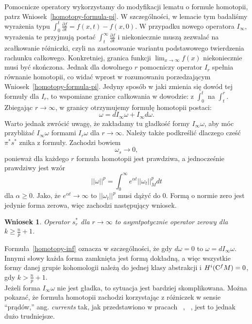 \documentclass[licencjacka]{pracamgr}
\theoremstyle{definition}
\theoremstyle{definition}
\theoremstyle{plain}
\theoremstyle{plain}
\theoremstyle{plain}
\theoremstyle{plain}
\newtheorem{wniosek}{Wniosek}[section]
\def\cfm{\ensuremath\mathrm{C}^fM}
\begin{document}
Pomocnicze operatory wykorzystamy do modyfikacji lematu o
formule homotopii, patrz Wniosek~\ref{homotopy-formula-pi}.
W szczególności, w lemacie tym badaliśmy wyrażenia typu
$\int_0^t \frac{\partial f }{\partial t} = f(x, t) - f(x, 0)$.
W przypadku nowego operatora $I_\infty$, wyrażenia te przyjmują postać
$\int_t^\infty \frac{\partial f }{\partial t}$ i niekoniecznie muszą
zezwalać na zcałkowanie różniczki, czyli na zastosowanie wariantu podstawowego
twierdzenia rachunku całkowego. Konkretniej, granica funkcji $\lim_{x \to \infty} f(x)$
niekoniecznie musi być skończona. Jednak dla dowolnego $r$ pomocniczy
operator $I_r$ spełnia równanie homotopii, co widać wprost w rozumowaniu
porzedzającym
Wniosek~\ref{homotopy-formula-pi}.
Jedyny sposób w jaki zmienia się dowód tej formuły dla $I_r$, to wspomiane granice
całkowania w dowodzie: z $\int_0^t$ na $\int_t^r$.
Zbiegając $r \to \infty$,  w granicy otrzymujemy formułę homotopii postaci:
\[\label{homotopy-inf}
\omega = dI_\infty \omega + I_\infty d \omega.
\]
Warto jednak zwrócić uwagę, że zakładamy tu gładkość formy $I_\infty \omega$,
aby móc przybliżać  $I_\infty\omega$ formami $I_r\omega$ dla $r \rightarrow
\infty$.  Należy także podkreślić dlaczego cześć $\pi^\ast s^\ast$ znika z
formuły.  Zachodzi bowiem
\[
 \omega_s  \to 0, 
\]
ponieważ dla każdego $r$ formuła homotopii jest prawdziwa, a jednocześnie
prawdziwy jest wzór
\[
|| \omega ||^p = \int_0^\infty e^{\alpha t} || \omega_t ||^p_M dt
\]
 dla $\alpha \geq 0$. Jako, że $e^{\alpha t} \to \infty$ to $|| \omega_t ||^p$
musi dążyć do 0.  Formą o normie zero jest jedynie forma zerowa, więc zachodzi
następujący wniosek.
\begin{wniosek}\label{asymtpotic-s-null-operator}
Operator $s_r^\ast$ dla $r \to \infty$ to asymtpotycznie operator zerowy dla
$k \geq \frac{n}{p} + 1$.
\end{wniosek}

Formuła~\ref{homotopy-inf} oznacza w szczególności, że gdy $d \omega = 0$ to
$\omega = d I_\infty \omega$. Innymi słowy każda forma zamknięta jest formą
dokładną, a więc wszystkie formy danej grupie kohomologii należą do jednej
klasy abstrakcji i $H^i(\cfm) = 0$, gdy $k > \frac{n}{p} + 1$. \\

Jeżeli forma $I_\infty\omega$ nie jest gładka, to sytuacja jest bardziej
skomplikowana.  Można pokazać, że formuła homotopii zachodzi korzystając z
różniczek w sensie ``prądów,'' ang. \emph{currents} tak, jak przedstawiono w
pracach ~\cite{weber}, ~\cite{cheeger}, jest to jednak dużo trudniejsze. \\
\end{document}

